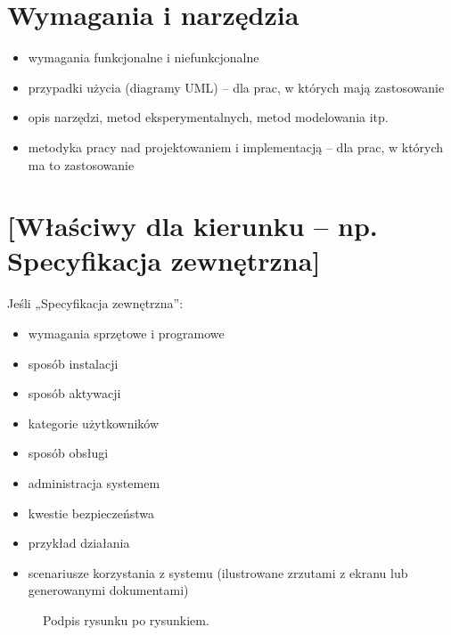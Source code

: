 \documentclass[a4paper,twoside,12pt]{book}
\begin{document}
\chapter{Wymagania i narzędzia}

\begin{itemize}
\item wymagania funkcjonalne i niefunkcjonalne
\item przypadki użycia (diagramy UML) -- dla prac, w których mają zastosowanie
\item opis narzędzi, metod eksperymentalnych, metod modelowania itp.
\item metodyka pracy nad projektowaniem i implementacją -- dla prac, w których ma to zastosowanie
\end{itemize}

\chapter{[Właściwy dla kierunku -- np. Specyfikacja zewnętrzna]}
Jeśli „Specyfikacja zewnętrzna”:
\begin{itemize}
\item  wymagania sprzętowe i programowe
\item  sposób instalacji
\item  sposób aktywacji
\item  kategorie użytkowników
\item  sposób obsługi
\item  administracja systemem
\item  kwestie bezpieczeństwa
\item  przykład działania
\item  scenariusze korzystania z systemu (ilustrowane zrzutami z ekranu lub generowanymi dokumentami)
\end{itemize}

 
\begin{figure}
\centering
{}
\caption{Podpis rysunku po rysunkiem.}
\label{fig:2}
\end{figure}
\end{document}
